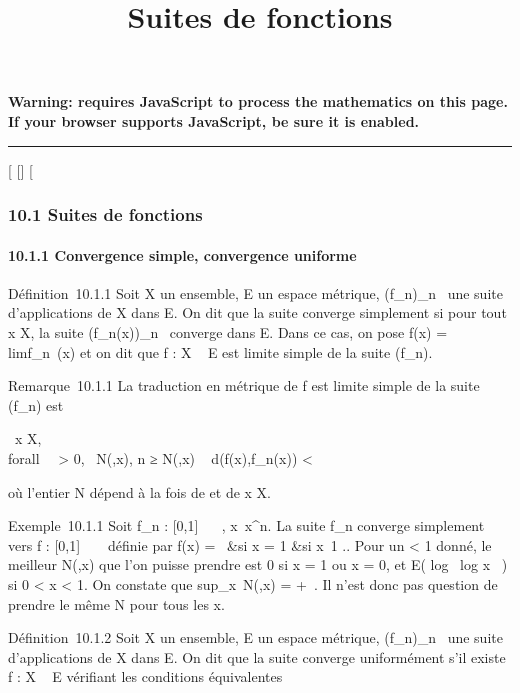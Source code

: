 \documentclass[]{article}
\title{Suites de fonctions}
\author{}
\date{}
\begin{document}
\maketitle

\textbf{Warning: 
requires JavaScript to process the mathematics on this page.\\ If your
browser supports JavaScript, be sure it is enabled.}

\begin{center}\rule{3in}{0.4pt}\end{center}

[
[]
[

\subsubsection{10.1 Suites de fonctions}

\paragraph{10.1.1 Convergence simple, convergence uniforme}

Définition~10.1.1 Soit X un ensemble, E un espace métrique,
(f_n)_n\in{}~ une suite d'applications de X dans E. On dit
que la suite converge simplement si pour tout x \in X, la suite
(f_n(x))_n\in{}~ converge dans E. Dans ce cas, on pose
f(x) = limf_n~(x) et on dit que f : X
\rightarrow~ E est limite simple de la suite (f_n).

Remarque~10.1.1 La traduction en métrique de f est limite simple de la
suite (f_n) est

\forall~x \in X, \\forall~~\epsilon
> 0, \exists~N(\epsilon,x),\quad
n ≥ N(\epsilon,x) \rigtharrow~ d(f(x),f_n(x)) < \epsilon

où l'entier N dépend à la fois de \epsilon et de x \in X.

Exemple~10.1.1 Soit f_n : [0,1] \rightarrow~ ~,
x\mapsto~x^n. La suite f_n
converge simplement vers f : [0,1] \rightarrow~ ~ définie par f(x) =
\left \ &si x
= 1 &si x\neq~1 
\right .. Pour un \epsilon < 1 donné, le meilleur
N(\epsilon,x) que l'on puisse prendre est 0 si x = 1 ou x = 0, et E(
log~ \epsilon \over
log x~ ) si 0 < x < 1. On
constate que sup_x\in[0,1]~N(\epsilon,x) =
+\infty~. Il n'est donc pas question de prendre le même N pour tous les x.

Définition~10.1.2 Soit X un ensemble, E un espace métrique,
(f_n)_n\in{}~ une suite d'applications de X dans E. On dit
que la suite converge uniformément s'il existe f : X \rightarrow~ E vérifiant les
conditions équivalentes
\end{document}

